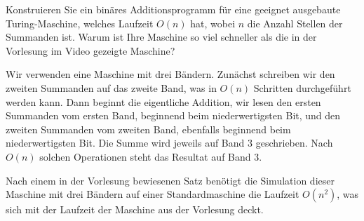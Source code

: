 Konstruieren Sie ein binäres Additionsprogramm für eine geeignet
ausgebaute Turing-Maschine, welches Laufzeit
$O(n)$ hat, wobei $n$ die Anzahl Stellen der Summanden ist.
Warum ist Ihre Maschine so viel schneller als die in der Vorlesung
im Video gezeigte Maschine?


\begin{loesung}
Wir verwenden eine Maschine mit drei Bändern. Zunächst schreiben
wir den zweiten Summanden auf das zweite Band, was in $O(n)$
Schritten durchgeführt werden kann.
Dann beginnt die
eigentliche Addition, wir lesen den ersten Summanden vom ersten Band,
beginnend beim niederwertigsten Bit, und den zweiten Summanden
vom zweiten Band, ebenfalls beginnend beim niederwertigsten Bit.
Die Summe wird jeweils auf Band 3 geschrieben. Nach $O(n)$
solchen Operationen steht das Resultat auf Band 3.

Nach einem in der Vorlesung bewiesenen Satz benötigt
die Simulation dieser Maschine mit drei Bändern auf einer Standardmaschine
die Laufzeit $O(n^2)$, was sich mit der Laufzeit der Maschine
aus der Vorlesung deckt.
\end{loesung}


